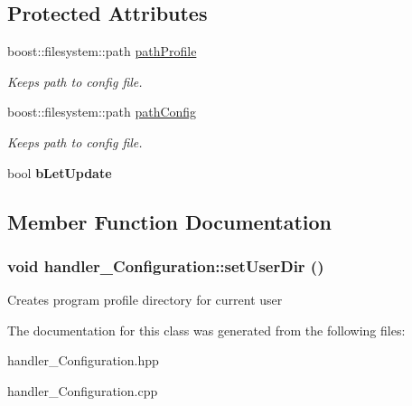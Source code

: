\subsection*{Protected Attributes}
\begin{DoxyCompactItemize}
\item 
\hypertarget{classhandler__Configuration_aa4302de200eb462a44938b64cb7ed944}{
boost::filesystem::path \hyperlink{classhandler__Configuration_aa4302de200eb462a44938b64cb7ed944}{pathProfile}}
\label{classhandler__Configuration_aa4302de200eb462a44938b64cb7ed944}

\begin{DoxyCompactList}\small\item\em Keeps path to config file. \item\end{DoxyCompactList}\item 
\hypertarget{classhandler__Configuration_af547a16146ccb86cf5102068e855b3a2}{
boost::filesystem::path \hyperlink{classhandler__Configuration_af547a16146ccb86cf5102068e855b3a2}{pathConfig}}
\label{classhandler__Configuration_af547a16146ccb86cf5102068e855b3a2}

\begin{DoxyCompactList}\small\item\em Keeps path to config file. \item\end{DoxyCompactList}\item 
\hypertarget{classhandler__Configuration_a1227b6391e07475da9686931a66b8150}{
bool {\bfseries bLetUpdate}}
\label{classhandler__Configuration_a1227b6391e07475da9686931a66b8150}

\end{DoxyCompactItemize}


\subsection{Member Function Documentation}
\hypertarget{classhandler__Configuration_a9f850565461949dbb96f6cc5028618c1}{
\subsubsection[{setUserDir}]{\setlength{\rightskip}{0pt plus 5cm}void handler\_\-Configuration::setUserDir ()}}
\label{classhandler__Configuration_a9f850565461949dbb96f6cc5028618c1}


Creates program profile directory for current user 



The documentation for this class was generated from the following files:\begin{DoxyCompactItemize}
\item 
handler\_\-Configuration.hpp\item 
handler\_\-Configuration.cpp\end{DoxyCompactItemize}
